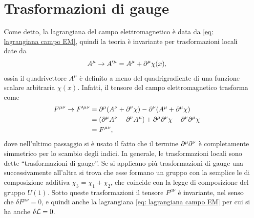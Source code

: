 \section{Trasformazioni di gauge}
Come detto, la lagrangiana del campo elettromagnetico è data da \eqref{eq: lagrangiana campo EM}, quindi la teoria è invariante per trasformazioni locali date da
\begin{equation}
    A^\mu \to A'^\mu = A^\mu + \partial^\mu\chi(x),
\end{equation}
ossia il quadrivettore $A^\mu$ è definito a meno del quadrigradiente di una funzione scalare arbitraria $\chi(x)$. Infatti, il tensore del campo elettromagnetico trasforma come
\begin{equation}
    \begin{split}
        F^{\mu\nu} \to F'^{\mu\nu} &= \partial^\mu(A^\nu + \partial^\nu\chi) - \partial^\nu(A^\mu + \partial^\mu\chi) \\
        &=(\partial^\mu A^\nu - \partial^\nu A^\mu) + \partial^\mu\partial^\nu\chi - \partial^\nu\partial^\mu\chi \\
        &= F^{\mu\nu},
    \end{split} 
\end{equation}
dove nell'ultimo passaggio si è usato il fatto che il termine $\partial^\mu\partial^\nu$ è completamente simmetrico per lo scambio degli indici. In generale, le trasformazioni locali sono dette ``trasformazioni di gauge''. Se si applicano più trasformazioni di gauge una successivamente all'altra si trova che esse formano un gruppo con la semplice le di composizione additiva $\chi_3 = \chi_1 + \chi_2$, che coincide con la legge di composizione del gruppo $U(1)$. Sotto queste trasformazioni il tensore $F^{\mu\nu}$ è invariante, nel senso che $\delta F^{\mu\nu} = 0$, e quindi anche la lagrangiana \eqref{eq: lagrangiana campo EM} per cui si ha anche $\delta\mathcal{L} = 0$.

